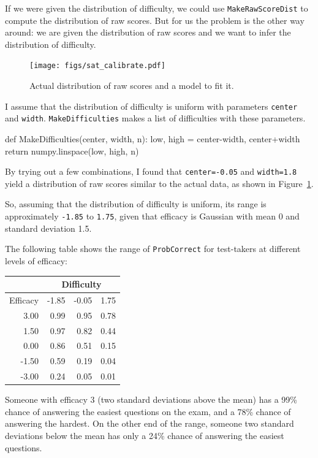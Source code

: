 \documentclass[12pt]{book}
\theoremstyle{exercise}
\begin{document}
If we were given the distribution of difficulty, we could use
\verb"MakeRawScoreDist" to compute the distribution of raw scores.
But for us the problem is the other way around: we are given the
distribution of raw scores and we want to infer the distribution of
difficulty.

\begin{figure}
\centerline{\texttt{[image: figs/sat\_calibrate.pdf]}}
\caption{Actual distribution of raw scores and a model to fit it.}
\label{fig.satcalibrate}
\end{figure}

I assume that the distribution of difficulty is uniform with
parameters {\tt center} and {\tt width}.  {\tt MakeDifficulties}
makes a list of difficulties with these parameters.

\begin{code}
def MakeDifficulties(center, width, n):
    low, high = center-width, center+width
    return numpy.linspace(low, high, n)
\end{code}

By trying out a few combinations, I found that
{\tt center=-0.05} and {\tt width=1.8} yield a distribution
of raw scores similar to the actual data, as shown in
Figure~\ref{fig.satcalibrate}.

So, assuming that the distribution of difficulty is uniform,
its range is approximately
{\tt -1.85} to {\tt 1.75}, given that
efficacy is Gaussian with mean 0 and standard deviation 1.5.

The following table shows the range of {\tt ProbCorrect} for
test-takers at different levels of efficacy:

\begin{tabular}{|r|r|r|r|}
\hline
           & \multicolumn{3}{|c|}{Difficulty} \\
\hline
Efficacy   & -1.85   &   -0.05   &      1.75  \\
\hline
3.00 &  0.99 &  0.95 &  0.78   \\
1.50 &  0.97 &  0.82 &  0.44   \\
0.00 &  0.86 &  0.51 &  0.15   \\
-1.50 &  0.59 &  0.19 &  0.04   \\
-3.00 &  0.24 &  0.05 &  0.01   \\
\hline
\end{tabular}

Someone with efficacy 3 (two standard deviations above
the mean) has a 99\% chance of answering the easiest questions on
the exam, and a 78\% chance of answering the hardest.  On the other
end of the range, someone two standard deviations below the mean
has only a 24\% chance of answering the easiest questions.
\end{document}
